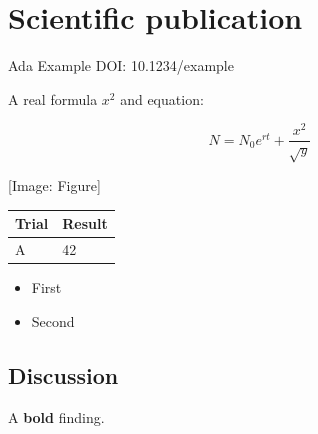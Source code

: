 \documentclass{article}
\begin{document}
\section{Scientific publication}

Ada Example
DOI: 10.1234/example

A real formula $x^2$ and equation:

\begin{equation}
N = N_0 e^{rt} + \frac{x^2}{\sqrt{y}}
\end{equation}

[Image: Figure]

\bigskip\noindent
\begin{tabular}{p{}p{}}
\toprule
Trial & Result \\
\hline
A & 42 \\
\bottomrule
\end{tabular}

\bigskip

\begin{itemize}
\item First
\item Second
\end{itemize}

\subsection{Discussion}

A \textbf{bold} finding.
\end{document}
